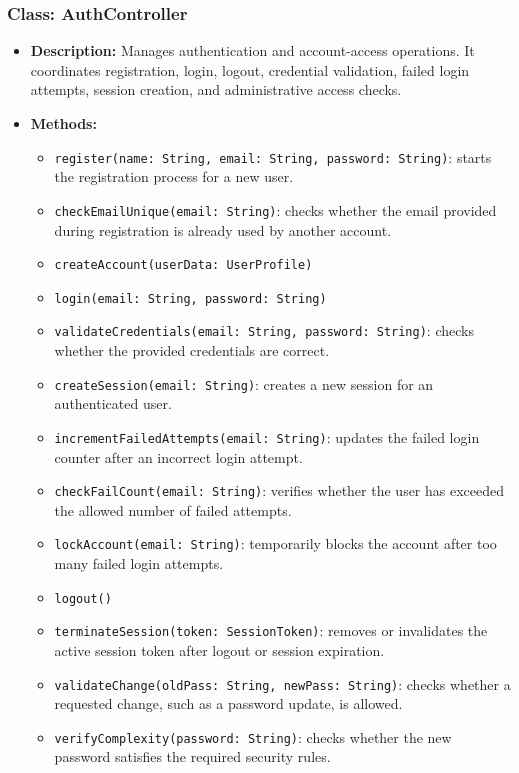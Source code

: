\documentclass{article}
\begin{document}
\subsubsection*{Class: AuthController}
\begin{itemize}
    \item \textbf{Description:} Manages authentication and account-access operations. It coordinates registration, login, logout, credential validation, failed login attempts, session creation, and administrative access checks.
    \item \textbf{Methods:}
    \begin{itemize}
        \item \texttt{register(name: String, email: String, password: String)}: starts the registration process for a new user.
        \item \texttt{checkEmailUnique(email: String)}: checks whether the email provided during registration is already used by another account.
        \item \texttt{createAccount(userData: UserProfile)}
        \item \texttt{login(email: String, password: String)}
        \item \texttt{validateCredentials(email: String, password: String)}: checks whether the provided credentials are correct.
        \item \texttt{createSession(email: String)}: creates a new session for an authenticated user.
        \item \texttt{incrementFailedAttempts(email: String)}: updates the failed login counter after an incorrect login attempt.
        \item \texttt{checkFailCount(email: String)}: verifies whether the user has exceeded the allowed number of failed attempts.
        \item \texttt{lockAccount(email: String)}: temporarily blocks the account after too many failed login attempts.
        \item \texttt{logout()}
        \item \texttt{terminateSession(token: SessionToken)}: removes or invalidates the active session token after logout or session expiration.
        \item \texttt{validateChange(oldPass: String, newPass: String)}: checks whether a requested change, such as a password update, is allowed.
        \item \texttt{verifyComplexity(password: String)}: checks whether the new password satisfies the required security rules.

\end{itemize}
\end{itemize}
\end{document}
